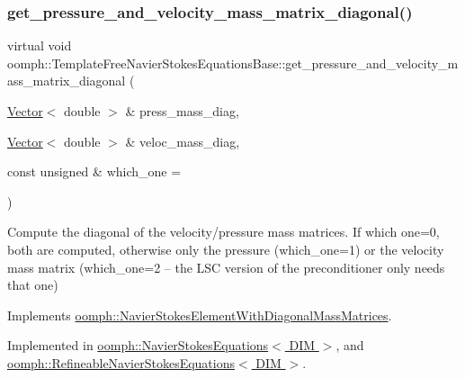 \subsubsection{\texorpdfstring{get\+\_\+pressure\+\_\+and\+\_\+velocity\+\_\+mass\+\_\+matrix\+\_\+diagonal()}{get\_pressure\_and\_velocity\_mass\_matrix\_diagonal()}}
{\footnotesize\ttfamily virtual void oomph\+::\+Template\+Free\+Navier\+Stokes\+Equations\+Base\+::get\+\_\+pressure\+\_\+and\+\_\+velocity\+\_\+mass\+\_\+matrix\+\_\+diagonal (\begin{DoxyParamCaption}\item[{\hyperlink{classoomph_1_1Vector}{Vector}$<$ double $>$ \&}]{press\+\_\+mass\+\_\+diag,  }\item[{\hyperlink{classoomph_1_1Vector}{Vector}$<$ double $>$ \&}]{veloc\+\_\+mass\+\_\+diag,  }\item[{const unsigned \&}]{which\+\_\+one = {} }\end{DoxyParamCaption})\hspace{0.3cm}{\ttfamily [pure virtual]}}



Compute the diagonal of the velocity/pressure mass matrices. If which one=0, both are computed, otherwise only the pressure (which\+\_\+one=1) or the velocity mass matrix (which\+\_\+one=2 -- the L\+SC version of the preconditioner only needs that one) 



Implements \hyperlink{classoomph_1_1NavierStokesElementWithDiagonalMassMatrices_a4d491d10823eee10381a9b14bce6c244}{oomph\+::\+Navier\+Stokes\+Element\+With\+Diagonal\+Mass\+Matrices}.



Implemented in \hyperlink{classoomph_1_1NavierStokesEquations_a2d6e748dd25be78b65f927cd2b257c55}{oomph\+::\+Navier\+Stokes\+Equations$<$ D\+I\+M $>$}, and \hyperlink{classoomph_1_1RefineableNavierStokesEquations_a94c16c8b4aa810e9e2f8df263654eaed}{oomph\+::\+Refineable\+Navier\+Stokes\+Equations$<$ D\+I\+M $>$}.

\mbox{\label{classoomph_1_1TemplateFreeNavierStokesEquationsBase_a4e84f2f4260a0e65201cbb19fd63b398}} 
